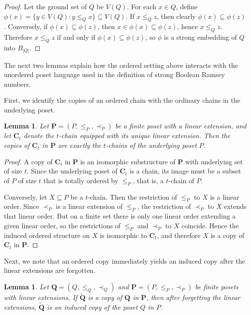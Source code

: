 \documentclass[twoside,12pt]{article}
\newtheorem{lemma}[theorem]{Lemma}
\begin{document}
\begin{proof}
Let the ground set of $Q$ be $V(Q)$. For each $x\in Q$, define
$\phi(x)=\{y\in V(Q): y\le_Q x\}\subseteq V(Q)$. If $x\le_Q z$, then clearly
$\phi(x)\subseteq \phi(z)$. Conversely, if $\phi(x)\subseteq \phi(z)$, then
$x\in \phi(x)\subseteq \phi(z)$, hence $x\le_Q z$. Therefore
$x\le_Q z$ if and only if $\phi(x)\subseteq \phi(z)$, so $\phi$ is a strong
embedding of $Q$ into $B_{|Q|}$.
\end{proof}
The next two lemmas explain how the ordered setting above interacts with the
unordered poset language used in the definition of strong Boolean Ramsey numbers.

First, we identify the copies of an ordered chain with the ordinary chains in
the underlying poset.

\begin{lemma}\label{lem:copies-of-chain}
Let $\mathbf P=(P,\le_P,\prec_P)$ be a finite poset with a linear extension, and let
$\mathbf C_t$ denote the $t$-chain equipped with its unique linear extension.
Then the copies of $\mathbf C_t$ in $\mathbf P$ are exactly the $t$-chains of the
underlying poset $P$.
\end{lemma}

\begin{proof}
A copy of $\mathbf C_t$ in $\mathbf P$ is an isomorphic substructure of $\mathbf P$
with underlying set of size $t$. Since the underlying poset of $\mathbf C_t$ is a chain,
its image must be a subset of $P$ of size $t$ that is totally ordered by $\le_P$,
that is, a $t$-chain of $P$.

Conversely, let $X\subseteq P$ be a $t$-chain. Then the restriction of $\le_P$ to $X$
is a linear order. Since $\prec_P$ is a linear extension of $\le_P$, the restriction
of $\prec_P$ to $X$ extends that linear order. But on a finite set there is only one
linear order extending a given linear order, so the restrictions of $\le_P$ and
$\prec_P$ to $X$ coincide. Hence the induced ordered structure on $X$ is isomorphic
to $\mathbf C_t$, and therefore $X$ is a copy of $\mathbf C_t$ in $\mathbf P$.
\end{proof}
Next, we note that an ordered copy immediately yields an induced copy after the
linear extensions are forgotten.
\begin{lemma}\label{lem:ordered-copy-gives-induced}
Let $\mathbf Q=(Q,\le_Q,\prec_Q)$ and $\mathbf P=(P,\le_P,\prec_P)$ be finite
posets with linear extensions. If $\widetilde{\mathbf Q}$ is a copy of
$\mathbf Q$ in $\mathbf P$, then after forgetting the linear extensions,
$\widetilde{\mathbf Q}$ is an induced copy of the poset $Q$ in $P$.
\end{lemma}
\end{document}
